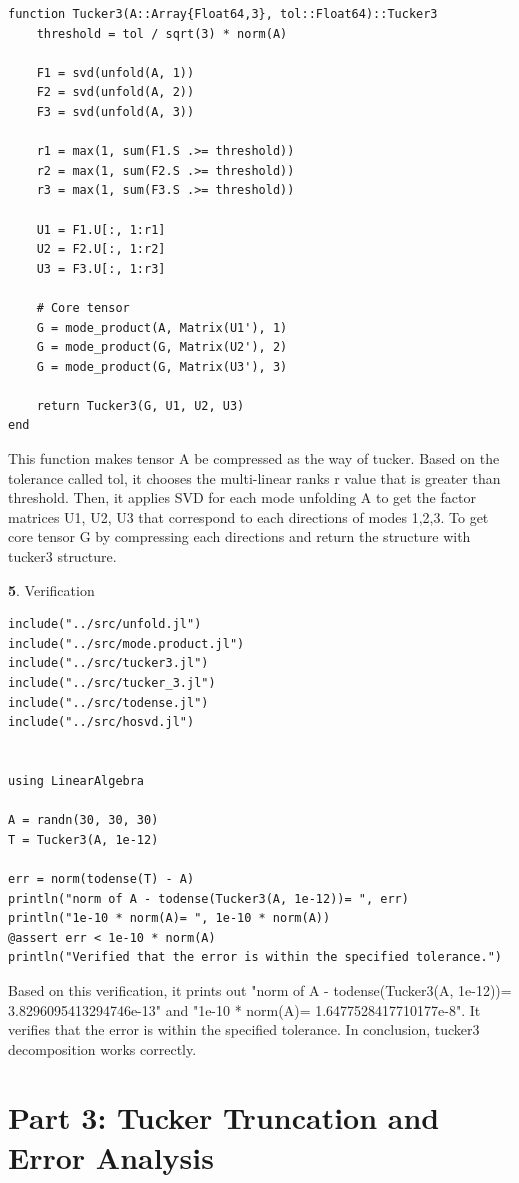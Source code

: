 \documentclass[11pt]{article}
\begin{document}
\begin{lstlisting}
function Tucker3(A::Array{Float64,3}, tol::Float64)::Tucker3
    threshold = tol / sqrt(3) * norm(A)

    F1 = svd(unfold(A, 1))
    F2 = svd(unfold(A, 2))
    F3 = svd(unfold(A, 3))

    r1 = max(1, sum(F1.S .>= threshold))
    r2 = max(1, sum(F2.S .>= threshold))
    r3 = max(1, sum(F3.S .>= threshold))

    U1 = F1.U[:, 1:r1]
    U2 = F2.U[:, 1:r2]
    U3 = F3.U[:, 1:r3]

    # Core tensor
    G = mode_product(A, Matrix(U1'), 1)
    G = mode_product(G, Matrix(U2'), 2)
    G = mode_product(G, Matrix(U3'), 3)

    return Tucker3(G, U1, U2, U3)
end
\end{lstlisting}

This function makes tensor A be compressed as the way of tucker. Based on the tolerance called tol, it chooses the multi-linear ranks r value that is greater than threshold. Then, it applies SVD for each mode unfolding A to get the factor matrices U1, U2, U3 that correspond to each directions of modes 1,2,3. To get core tensor G by compressing each directions and return the structure with tucker3 structure. 

\vspace{1.5em}

\textbf{5}. Verification

\begin{lstlisting}
include("../src/unfold.jl")
include("../src/mode.product.jl")
include("../src/tucker3.jl")
include("../src/tucker_3.jl")
include("../src/todense.jl")
include("../src/hosvd.jl")


using LinearAlgebra

A = randn(30, 30, 30)
T = Tucker3(A, 1e-12)

err = norm(todense(T) - A)
println("norm of A - todense(Tucker3(A, 1e-12))= ", err)
println("1e-10 * norm(A)= ", 1e-10 * norm(A))
@assert err < 1e-10 * norm(A)
println("Verified that the error is within the specified tolerance.")
\end{lstlisting}

Based on this verification, it prints out "norm of A - todense(Tucker3(A, 1e-12))= 3.8296095413294746e-13" and "1e-10 * norm(A)= 1.6477528417710177e-8". It verifies that the error is within the specified tolerance. In conclusion, tucker3 decomposition works correctly.

\section*{Part 3: Tucker Truncation and Error Analysis}
\end{document}
